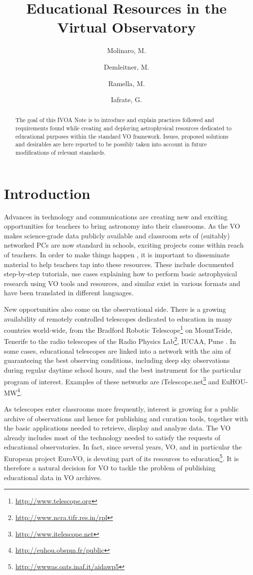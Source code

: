\documentclass{ivoa}
\author{Molinaro, M.}
\author{Demleitner, M.}
\author{Ramella, M.}
\author{Iafrate, G.}
\title{Educational Resources in the Virtual Observatory}
\begin{document}
\begin{abstract}

The goal of this IVOA Note is to introduce and explain practices followed
and requirements found while creating and 
deploying astrophysical resources 
dedicated to educational purposes within the standard VO framework.
Issues, proposed solutions and desirables are here reported to be
possibly taken into account in future modifications of relevant
standards.



\end{abstract}


\section{Introduction}

Advances in technology and communications are creating new and exciting 
opportunities for teachers to bring astronomy into their 
classrooms.  As the VO makes science-grade data publicly available and
classroom sets of (suitably) networked PCs are now standard in schools,
exciting projects come within reach of teachers.  In order to make things happen
, it is important to disseminate material to help teachers
tap into these resources.  These include documented step-by-step
tutorials, use cases explaining how to perform basic astrophysical research 
using VO tools and resources, and similar exist in various formats and
have been translated in different languages.


New opportunities also come on the observational side. 
There is a growing availability of remotely controlled 
telescopes dedicated to education in many countries world-wide, from the 
Bradford Robotic Telescope\footnote{\url{http://www.telescope.org}} on MountTeide, Tenerife 
to the radio telescopes of the Radio Physics
Lab\footnote{\url{http://www.ncra.tifr.res.in/rpl}}, IUCAA, Pune 
. In some cases, educational telescopes are 
linked into a network with the aim of guaranteeing the best observing conditions, 
including deep sky observations during regular daytime school hours, and 
the best instrument for the particular program of interest. Examples
of these networks are
iTelescope.net\footnote{\url{http://www.itelescope.net}} and
EuHOU-MW\footnote{\url{http://euhou.obspm.fr/public}}.



As telescopes enter classrooms more frequently, interest is growing for a 
public archive of observations and hence for publishing and curation tools, 
together with the basic applications needed to retrieve, display
and analyze data. The VO already includes most of the technology needed 
to satisfy the requests of educational observatories. In fact, since several 
years, VO, and in particular the European project EuroVO, is devoting part 
of its resources to
education\footnote{\url{http://wwwas.oats.inaf.it/aidawp5}}. It is 
therefore a natural decision for VO to tackle the problem of publishing 
educational data in VO archives.
\end{document}
